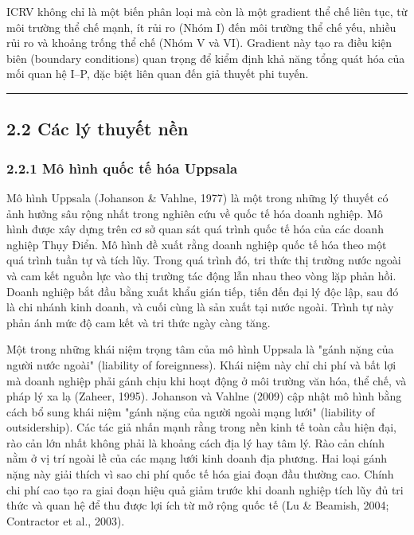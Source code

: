 \documentclass[12pt,a4paper]{article}
\begin{document}
ICRV không chỉ là một biến phân loại mà còn là một gradient thể chế liên
tục, từ môi trường thể chế mạnh, ít rủi ro (Nhóm I) đến môi trường thể
chế yếu, nhiều rủi ro và khoảng trống thể chế (Nhóm V và VI). Gradient
này tạo ra điều kiện biên (boundary conditions) quan trọng để kiểm định
khả năng tổng quát hóa của mối quan hệ I--P, đặc biệt liên quan đến giả
thuyết phi tuyến.

\begin{center}\rule{0.5\linewidth}{0.5pt}\end{center}

\hypertarget{22-cuxe1c-luxfd-thuyux1ebft-nux1ec1n}{%
\subsection{2.2 Các lý thuyết
nền}\label{22-cuxe1c-luxfd-thuyux1ebft-nux1ec1n}}

\hypertarget{221-muxf4-huxecnh-quux1ed1c-tux1ebf-huxf3a-uppsala}{%
\subsubsection{2.2.1 Mô hình quốc tế hóa
Uppsala}\label{221-muxf4-huxecnh-quux1ed1c-tux1ebf-huxf3a-uppsala}}

Mô hình Uppsala (Johanson \& Vahlne, 1977) là một trong những lý thuyết
có ảnh hưởng sâu rộng nhất trong nghiên cứu về quốc tế hóa doanh nghiệp.
Mô hình được xây dựng trên cơ sở quan sát quá trình quốc tế hóa của các
doanh nghiệp Thụy Điển. Mô hình đề xuất rằng doanh nghiệp quốc tế hóa
theo một quá trình tuần tự và tích lũy. Trong quá trình đó, tri thức thị
trường nước ngoài và cam kết nguồn lực vào thị trường tác động lẫn nhau
theo vòng lặp phản hồi. Doanh nghiệp bắt đầu bằng xuất khẩu gián tiếp,
tiến đến đại lý độc lập, sau đó là chi nhánh kinh doanh, và cuối cùng là
sản xuất tại nước ngoài. Trình tự này phản ánh mức độ cam kết và tri
thức ngày càng tăng.

Một trong những khái niệm trọng tâm của mô hình Uppsala là "gánh nặng
của người nước ngoài" (liability of foreignness). Khái niệm này chỉ chi
phí và bất lợi mà doanh nghiệp phải gánh chịu khi hoạt động ở môi trường
văn hóa, thể chế, và pháp lý xa lạ (Zaheer, 1995). Johanson và Vahlne
(2009) cập nhật mô hình bằng cách bổ sung khái niệm "gánh nặng của người
ngoài mạng lưới" (liability of outsidership). Các tác giả nhấn mạnh rằng
trong nền kinh tế toàn cầu hiện đại, rào cản lớn nhất không phải là
khoảng cách địa lý hay tâm lý. Rào cản chính nằm ở vị trí ngoài lề của
các mạng lưới kinh doanh địa phương. Hai loại gánh nặng này giải thích
vì sao chi phí quốc tế hóa giai đoạn đầu thường cao. Chính chi phí cao
tạo ra giai đoạn hiệu quả giảm trước khi doanh nghiệp tích lũy đủ tri
thức và quan hệ để thu được lợi ích từ mở rộng quốc tế (Lu \& Beamish,
2004; Contractor et al., 2003).
\end{document}
